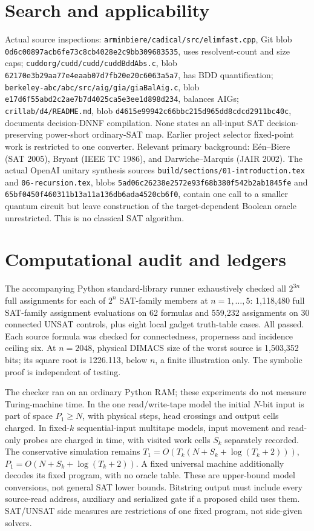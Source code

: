 \documentclass[11pt]{article}
\begin{document}
\section{Search and applicability}
Actual source inspections: \texttt{arminbiere/cadical/src/elimfast.cpp}, Git blob \texttt{0d6c00897acb6fe73c8cb4028e2c9bb309683535}, uses resolvent-count and size caps; \texttt{cuddorg/cudd/cudd/cuddBddAbs.c}, blob \texttt{62170e3b29aa77e4eaab07d7fb20e20c6063a5a7}, has BDD quantification; \texttt{berkeley-abc/abc/src/aig/gia/giaBalAig.c}, blob \texttt{e17d6f55abd2c2ae7b7d4025ca5e3ee1d898d234}, balances AIGs; \texttt{crillab/d4/README.md}, blob \texttt{d4615e99942c66bbc215d965dd8cdcd2911bc40c}, documents decision-DNNF compilation. None states an all-input SAT decision-preserving power-short ordinary-SAT map. Earlier project selector fixed-point work is restricted to one converter. Relevant primary background: E\'en--Biere (SAT 2005), Bryant (IEEE TC 1986), and Darwiche--Marquis (JAIR 2002).
The actual OpenAI unitary synthesis sources \texttt{build/sections/01-introduction.tex} and \texttt{06-recursion.tex}, blobs \texttt{5ad06c26238e2572e93f68b380f542b2ab1845fe} and \texttt{65bf0450f460311b13a11a136db6ada4520cb6f0}, contain one call to a smaller quantum circuit but leave construction of the target-dependent Boolean oracle unrestricted. This is no classical SAT algorithm.

\section{Computational audit and ledgers}
The accompanying Python standard-library runner exhaustively checked all $2^{3n}$ full assignments for each of $2^n$ SAT-family members at $n=1,\ldots,5$: 1,118,480 full SAT-family assignment evaluations on 62 formulas and 559,232 assignments on 30 connected UNSAT controls, plus eight local gadget truth-table cases. All passed. Each source formula was checked for connectedness, properness and incidence ceiling six. At $n=2048$, physical DIMACS size of the worst source is 1,503,352 bits; its square root is 1226.113, below $n$, a finite illustration only. The symbolic proof is independent of testing.

The checker ran on an ordinary Python RAM; these experiments do not measure Turing-machine time. In the one read/write-tape model the initial $N$-bit input is part of space $P_1\ge N$, with physical steps, head crossings and output cells charged. In fixed-$k$ sequential-input multitape models, input movement and read-only probes are charged in time, with visited work cells $S_k$ separately recorded. The conservative simulation remains $T_1=O(T_k(N+S_k+\log(T_k+2)))$, $P_1=O(N+S_k+\log(T_k+2))$. A fixed universal machine additionally decodes its fixed program, with no oracle table. These are upper-bound model conversions, not general SAT lower bounds. Bitstring output must include every source-read address, auxiliary and serialized gate if a proposed child uses them. SAT/UNSAT side measures are restrictions of one fixed program, not side-given solvers.
\end{document}
